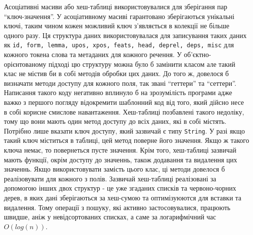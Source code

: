 Асоціативні масиви або хеш-таблиці використовувалися для зберігання пар ``ключ-значення''.
У асоціативному масиві гарантовано зберігаються унікальні ключі, таким чином кожен 
можливий ключ з’являється в колекції не більше одного разу. Ця структура даних
використовувалася для записування таких даних як \texttt{id, form, lemma, upos, xpos,
feats, head, deprel, deps, misc} для кожного токена слова та метаданих для кожного
речення. У об'єктно-орієнтованому підході цю структуру
можна було б замінити класом але такий клас не містив би в собі
методів обробки цих даних. До того ж, довелося б визначати методи доступу для кожного
поля, так звані ``геттери'' та ``сеттери''. Написання такого коду негативно
вплинуло б на зрозумілість програми адже важко з першого погляду відокремити
шаблонний код від того, який дійсно несе в собі корисне смислове навантаження.
Хеш-таблиці позбавлені такого недоліку, тому що вони мають один метод доступу
до всіх даних, які в собі містять. Потрібно лише вказати ключ доступу, який зазвичай
є типу \texttt{String}. У разі якщо такий ключ міститься в таблиці, цей метод поверне
його значення. Якщо ж такого ключа немає, то повернеться пусте значення. Крім того,
хеш-таблиці зазвичай мають функції, окрім доступу до значеннь, також додавання
та видалення цих значеннь. Якщо використовувати замість цього клас, ці методи довелося б
реалізовувати для кожного з полів. Зазвичай хеш-таблиці реалізовані за допомогою
інших двох структур - це уже згаданих списків та червоно-чорних дерев, в яких дані
зберігаються за хеш-сумою та оптимізуюются для вставки та видалення. Тому операції
з пошуку, які активно застосовувалися, працюють швидше, аніж у невідсортованих
списках, а саме за логарифмічний час $O(log(n))$.

